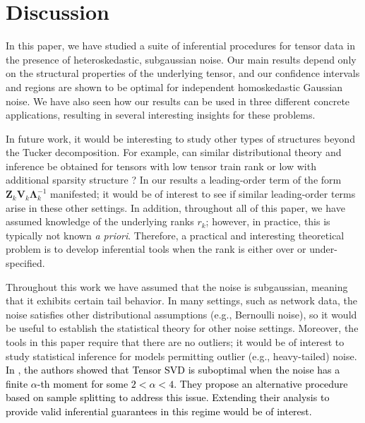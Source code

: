 \documentclass[10pt]{article}
\newcommand{\0}{{\mathbf{0}}}
\newcommand{\1}{{\mathbf{1}}}
\renewcommand{\citet}{\cite}
\newcommand{\inv}{^{-1}}
\begin{document}
\section{Discussion}
\label{sec:discussion}
In this paper, we have studied a suite of inferential procedures for tensor data in the presence of heteroskedastic, subgaussian noise.  Our main results depend only on the structural properties of the underlying tensor, and our confidence intervals and regions are shown to be optimal for independent homoskedastic Gaussian noise.  We have also seen how our results can be used in three different concrete applications, resulting in several interesting insights for these problems.

In future work, it would be interesting to study other types of structures beyond the Tucker decomposition.  For example, can similar distributional theory and inference be obtained for tensors with low tensor train rank \citep{zhou_optimal_2022,cai_provable_2022} or low with additional sparsity structure \citep{zhang_optimal_2019}?  In our results a leading-order term of the form $\mathbf{Z}_k \mathbf{V}_k \mathbf{\Lambda}_k\inv$ manifested; it would be of interest to see if similar leading-order  terms arise in these other settings. In addition, throughout all of this paper, we have assumed knowledge of the underlying ranks  $r_k$; however, in practice, this is typically not known \emph{a priori}.  Therefore, a practical and interesting theoretical problem is to develop inferential tools when the rank is either over or under-specified.   

Throughout this work we have assumed that the noise is subgaussian, meaning that it exhibits certain tail behavior.  In many settings, such as network data, the noise satisfies other distributional assumptions (e.g., Bernoulli noise), so it would be useful to establish the statistical theory for other noise settings.  Moreover, the tools in this paper require that there are no outliers; it would be of interest to study statistical inference for models permitting outlier (e.g., heavy-tailed) noise. \textcolor{black}{In \citet{auddy_estimating_2022}, the authors showed that Tensor SVD is suboptimal when the noise has a finite $\alpha$-th moment for some $2 < \alpha < 4$. They propose an alternative procedure based on sample splitting to address this issue. Extending their analysis to provide valid inferential guarantees in this regime would be of interest.}
\end{document}
